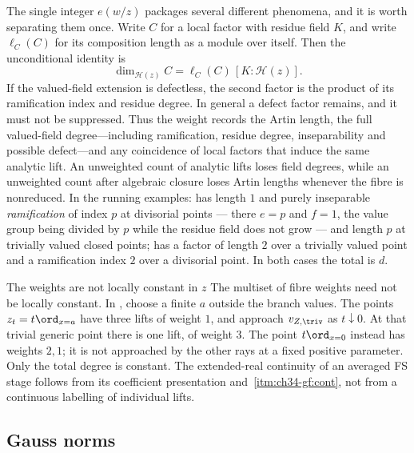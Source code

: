 \begin{remark}
\label{rem:ch41-weight-anatomy}
The single integer $e(w/z)$ packages several different phenomena, and it
is worth separating them once.  Write $C$ for a local factor with residue
field $K$, and write $\ell_C(C)$ for its composition length as a
module over itself.  Then the unconditional identity is
\[
 \dim_{\mathcal H(z)}C
 =\ell_C(C)\,[K:\mathcal H(z)].
\]
If the valued-field extension is defectless, the second factor is the
product of its ramification index and residue degree.  In general a defect
factor remains, and it must not be suppressed.  Thus the weight records the
Artin length, the full valued-field degree---including ramification, residue
degree, inseparability and possible defect---and any coincidence of local
factors that induce the same analytic lift.  An unweighted count of
analytic lifts loses field degrees, while an unweighted count after
algebraic closure loses Artin lengths whenever the fibre is nonreduced.  In the running examples:
 has
length $1$ and purely inseparable \emph{ramification} of index $p$ at
divisorial points --- there $e=p$ and $f=1$, the value group being
divided by $p$ while the residue field does not grow --- and length
$p$ at trivially valued closed points;
 has a factor of length $2$ over a
trivially valued point and a ramification index $2$ over a divisorial
point.  In both cases the total is $d$.
\end{remark}

\begin{warning}{The weights are not locally constant in $z$}
\label{warn:ch41-weights-not-constant}
The multiset of fibre weights need not be locally constant.
In , choose a finite $a$ outside the
branch values.  The points $z_t=t\ord_{x=a}$ have three lifts of
weight $1$, and approach $v_{Z,\triv}$ as $t\downarrow0$.
At that trivial generic point there is one lift, of weight $3$.
The point $t\ord_{x=0}$ instead has weights $2,1$; it is not
approached by the other rays at a fixed positive parameter.
Only the total degree is constant.  The extended-real continuity of
an averaged FS stage follows from its coefficient presentation and
\,\cref{itm:ch34-gf:cont},
not from a continuous labelling of individual lifts.
\end{warning}

\subsection{Gauss norms}
\label{sec:ch41-gauss}

